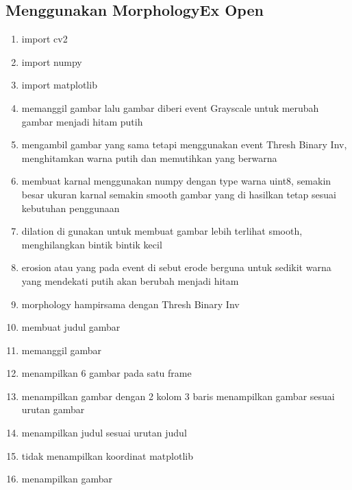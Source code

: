 \subsection{Menggunakan MorphologyEx Open}

\begin{enumerate}
	\item import cv2
	\item import numpy
	\item import matplotlib
	\item memanggil gambar lalu gambar diberi event Grayscale untuk merubah gambar menjadi hitam putih
	\item mengambil gambar yang sama tetapi menggunakan event Thresh Binary Inv, menghitamkan warna putih dan memutihkan yang berwarna
	\item membuat karnal menggunakan numpy dengan type warna uint8, semakin besar ukuran karnal semakin smooth gambar yang di hasilkan tetap sesuai kebutuhan penggunaan
	\item dilation di gunakan untuk membuat gambar lebih terlihat smooth, menghilangkan bintik bintik kecil
	\item erosion atau yang pada event di sebut erode berguna untuk sedikit warna yang mendekati putih akan berubah menjadi hitam
	\item morphology hampirsama dengan Thresh Binary Inv
	\item membuat judul gambar
	\item memanggil gambar
	\item menampilkan 6 gambar pada satu frame
	\item menampilkan gambar dengan 2 kolom 3 baris menampilkan gambar sesuai urutan gambar
	\item menampilkan judul sesuai urutan judul
	\item tidak menampilkan koordinat matplotlib
	\item menampilkan gambar
\end{enumerate}

